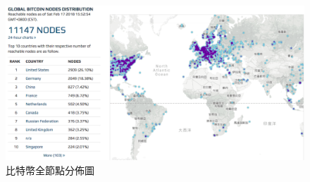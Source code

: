 	\begin{figure}
		\centering
		\includegraphics[width = .9\textwidth]{bitcoinfullnode.png}
		\caption{比特幣全節點分佈圖\supercite{bitcoinfullnode}}\label{bitcoinfullnode}
	\end{figure}





